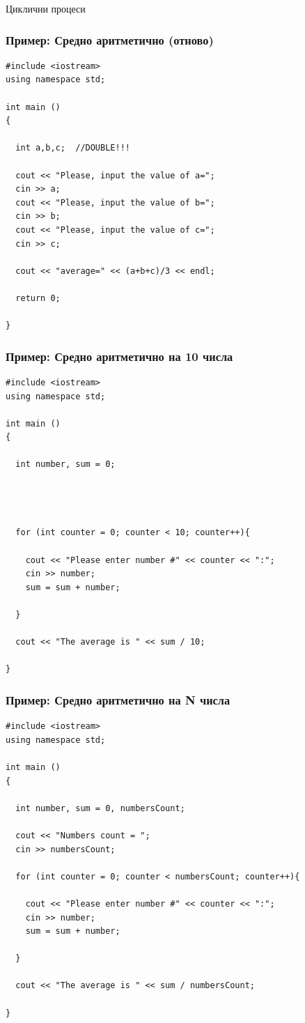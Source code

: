 \documentclass{beamer}
\begin{document}
\begin{frame}
\centerline{Циклични процеси}
\end{frame}



\begin{frame}[fragile]
\frametitle{Пример: Средно аритметично (отново)}

\begin{lstlisting}
#include <iostream>
using namespace std;

int main ()
{
  
  int a,b,c;  //DOUBLE!!!

  cout << "Please, input the value of a=";
  cin >> a;
  cout << "Please, input the value of b=";
  cin >> b;
  cout << "Please, input the value of c=";
  cin >> c;
  
  cout << "average=" << (a+b+c)/3 << endl;

  return 0;

}
\end{lstlisting}

\end{frame} 

\begin{frame}[fragile]
\frametitle{Пример: Средно аритметично на 10 числа}

\begin{lstlisting}
#include <iostream>
using namespace std;

int main ()
{
  
  int number, sum = 0;




  for (int counter = 0; counter < 10; counter++){

    cout << "Please enter number #" << counter << ":";
    cin >> number;
    sum = sum + number;

  }

  cout << "The average is " << sum / 10;

}
\end{lstlisting}

\end{frame} 

\begin{frame}[fragile]
\frametitle{Пример: Средно аритметично на N числа}

\begin{lstlisting}
#include <iostream>
using namespace std;

int main ()
{
  
  int number, sum = 0, numbersCount;

  cout << "Numbers count = ";
  cin >> numbersCount;

  for (int counter = 0; counter < numbersCount; counter++){

    cout << "Please enter number #" << counter << ":";
    cin >> number;
    sum = sum + number;

  }

  cout << "The average is " << sum / numbersCount;

}
\end{lstlisting}

\end{frame} 
\end{document}
